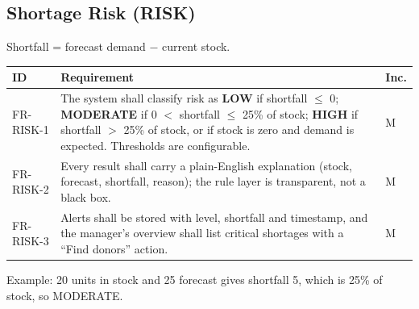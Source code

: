 \documentclass{scrreprt}
\begin{document}
\subsection*{Shortage Risk (RISK)}
Shortfall = forecast demand $-$ current stock.
\begin{longtable}{@{}l L{11.6cm} l@{}}
\toprule
\textbf{ID} & \textbf{Requirement} & \textbf{Inc.}\\
\midrule
\endhead
FR-RISK-1 & The system shall classify risk as \textbf{LOW} if shortfall $\le$ 0; \textbf{MODERATE} if 0 $<$ shortfall $\le$ 25\% of stock; \textbf{HIGH} if shortfall $>$ 25\% of stock, or if stock is zero and demand is expected. Thresholds are configurable. & M\\
FR-RISK-2 & Every result shall carry a plain-English explanation (stock, forecast, shortfall, reason); the rule layer is transparent, not a black box. & M\\
FR-RISK-3 & Alerts shall be stored with level, shortfall and timestamp, and the manager's overview shall list critical shortages with a ``Find donors'' action. & M\\
\bottomrule
\end{longtable}
Example: 20 units in stock and 25 forecast gives shortfall 5, which is 25\% of stock, so MODERATE.
\end{document}
